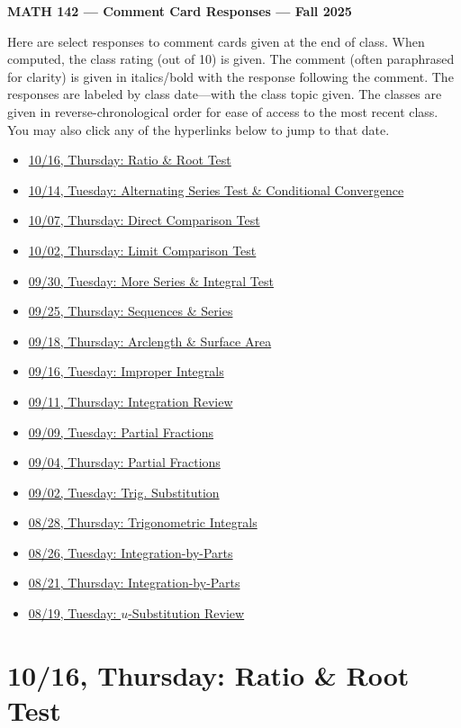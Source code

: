\documentclass[11pt,letterpaper]{article}
\begin{document}
\begin{center} {\bfseries \LARGE MATH 142 --- Comment Card Responses --- Fall 2025} \end{center}

Here are select responses to comment cards given at the end of class. When computed, the class rating (out of 10) is given. The comment (often paraphrased for clarity) is given in italics/bold with the response following the comment. The responses are labeled by class date---with the class topic given. The classes are given in reverse-chronological order for ease of access to the most recent class. You may also click any of the hyperlinks below to jump to that date.

\begin{itemize}
\item \hyperref[10-16]{10/16, Thursday: Ratio \& Root Test}
\item \hyperref[10-14]{10/14, Tuesday: Alternating Series Test \& Conditional Convergence}
\item \hyperref[10-07]{10/07, Thursday: Direct Comparison Test}
\item \hyperref[10-02]{10/02, Thursday: Limit Comparison Test}
\item \hyperref[09-30]{09/30, Tuesday: More Series \& Integral Test}
\item \hyperref[09-25]{09/25, Thursday: Sequences \& Series}
\item \hyperref[09-18]{09/18, Thursday: Arclength \& Surface Area}
\item \hyperref[09-16]{09/16, Tuesday: Improper Integrals}
\item \hyperref[09-11]{09/11, Thursday: Integration Review}
\item \hyperref[09-09]{09/09, Tuesday: Partial Fractions}
\item \hyperref[09-04]{09/04, Thursday: Partial Fractions}
\item \hyperref[09-02]{09/02, Tuesday: Trig. Substitution}
\item \hyperref[08-28]{08/28, Thursday: Trigonometric Integrals}
\item \hyperref[08-26]{08/26, Tuesday: Integration-by-Parts}
\item \hyperref[08-21]{08/21, Thursday: Integration-by-Parts}
\item \hyperref[08-19]{08/19, Tuesday: $u$-Substitution Review}
\end{itemize}

\newpage
\section*{10/16, Thursday: Ratio \& Root Test\label{10-16}}
\end{document}
